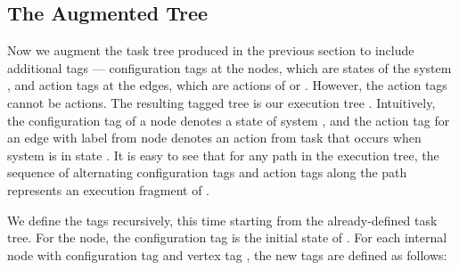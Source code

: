 \documentclass[11pt]{article}
\numberwithin{theorem}{section}
\begin{document}
\subsection{The Augmented Tree}\label{subsec:TheAugmentedTree}



Now we augment the task tree produced in the previous section to
include additional tags --- configuration tags  at the nodes, which are states of
the system , and action tags  at the edges, which are actions of 
or . However, the action tags cannot be  actions.
The resulting tagged tree is our execution tree . Intuitively, the configuration tag  of a node  denotes a state of system , and the action tag  for an edge  with label  from node  denotes an action  from task  that occurs when system  is in state . It is easy to see that for any path in the execution tree, the sequence of alternating configuration tags and action tags along the path represents an execution fragment of .

We define the tags recursively, this time starting from the
already-defined task tree.
For the  node, the configuration tag is the initial state of
.
For each internal node  with configuration tag  and vertex tag ,
the new tags are defined as follows:
\end{document}
